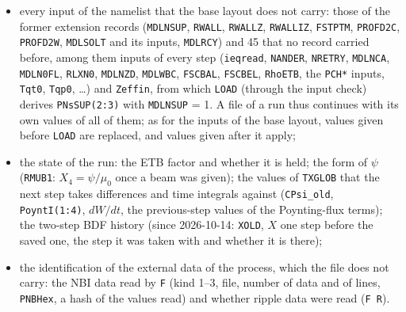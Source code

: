 \documentclass[11pt]{article}
\begin{document}
\begin{itemize}
\item every input of the namelist that the base layout does not carry: those of the former
  extension records (\texttt{MDLNSUP}, \texttt{RWALL}, \texttt{RWALLZ}, \texttt{RWALLIZ},
  \texttt{FSTPTM}, \texttt{PROFD2C}, \texttt{PROFD2W}, \texttt{MDLSOLT} and its inputs,
  \texttt{MDLRCY}) and 45 that no record carried before, among them inputs of every step
  (\texttt{ieqread}, \texttt{NANDER}, \texttt{NRETRY}, \texttt{MDLNCA}, \texttt{MDLN0FL},
  \texttt{RLXN0}, \texttt{MDLNZD}, \texttt{MDLWBC}, \texttt{FSCBAL}, \texttt{FSCBEL},
  \texttt{RhoETB}, the \texttt{PCH*} inputs, \texttt{Tqt0}, \texttt{Tqp0}, \ldots) and
  \texttt{Zeffin}, from which \texttt{LOAD} (through the input check) derives
  \texttt{PNsSUP(2:3)} with \texttt{MDLNSUP} = 1.  A file of a run thus continues with its own
  values of all of them; as for the inputs of the base layout, values given before
  \texttt{LOAD} are replaced, and values given after it apply;
\item the state of the run: the ETB factor and whether it is held; the form of $\psi$
  (\texttt{RMUB1}: $X_4=\psi/\mu_0$ once a beam was given); the values of \texttt{TXGLOB} that
  the next step takes differences and time integrals against (\texttt{CPsi\_old},
  \texttt{PoyntI(1:4)}, $dW/dt$, the previous-step values of the Poynting-flux terms); the
  two-step BDF history (since 2026-10-14: \texttt{XOLD}, $X$ one step before the saved one, the
  step it was taken with and whether it is there);
\item the identification of the external data of the process, which the file does not carry:
  the NBI data read by \texttt{F} (kind 1--3, file, number of data and of lines,
  \texttt{PNBHex}, a hash of the values read) and whether ripple data were read (\texttt{F R}).
\end{itemize}
\end{document}

